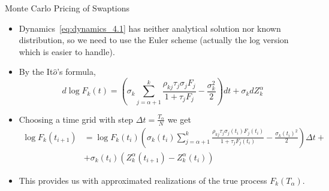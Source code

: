 \documentclass{beamer}
\begin{document}
\begin{frame}{Monte Carlo Pricing of Swaptions}
\begin{itemize}
\item Dynamics~\ref{eq:dynamics_4.1} has neither analytical solution nor known distribution, so we need to use the Euler scheme (actually the log version which is easier to handle).
\item By the It$\hat{o}$’s formula,
\begin{equation*}
	d\log F_k(t) = \left(\sigma_k\sum_{j=\alpha+1}^k\frac{\rho_{kj}\tau_j\sigma_jF_j}{1+\tau_jF_j}-\frac{\sigma_k^2}{2}\right)dt+\sigma_k dZ^\alpha_k
\end{equation*}
\item Choosing a time grid with step $\Delta t = \frac{T_\alpha}{N}$ we get
\begin{equation*}
\begin{aligned}
\log F_k(t_{i+1}) &=\log F_k(t_i) \left(\sigma_k(t_i)\sum_{j=\alpha+1}^k\frac{\rho_{kj}\tau_j\sigma_j(t_i)F_j(t_i)}{1+\tau_jF_j(t_i)}-\frac{\sigma_k(t_i)^2}{2}\right)\Delta t + \\
&+\sigma_k(t_i) (Z^\alpha_k(t_{i+1}) - Z^\alpha_k(t_i))
\end{aligned}
\end{equation*}
\item This provides us with approximated realizations of the true process $F_k(T_\alpha)$.
\end{itemize}
\end{frame}

\end{document}
